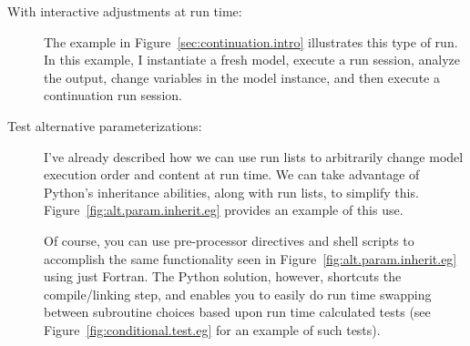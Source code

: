 \begin{description}
\item[With interactive adjustments at run time:]
	The example in Figure~\ref{sec:continuation.intro}
	illustrates this type of run.  In this example,
	I instantiate a fresh model, execute a run session, analyze the
	output, change variables in the model instance, and then
	execute a continuation run session.


\item[Test alternative parameterizations:]
	I've already described how we can use run lists to arbitrarily
	change model execution order and content at run time.
	We can take advantage of Python's inheritance
	abilities, along with run lists, to simplify this.
	Figure~\ref{fig:alt.param.inherit.eg} provides an example of
	this use.

	Of course, you can use pre-processor directives and shell
	scripts to accomplish the same functionality seen in
	Figure~\ref{fig:alt.param.inherit.eg} using just Fortran.
	The Python solution, however, shortcuts the compile/linking
	step, and enables you to easily do run time swapping between
	subroutine choices based upon run time calculated
	tests (see Figure~\ref{fig:conditional.test.eg} for an
	example of such tests).
\end{description}




